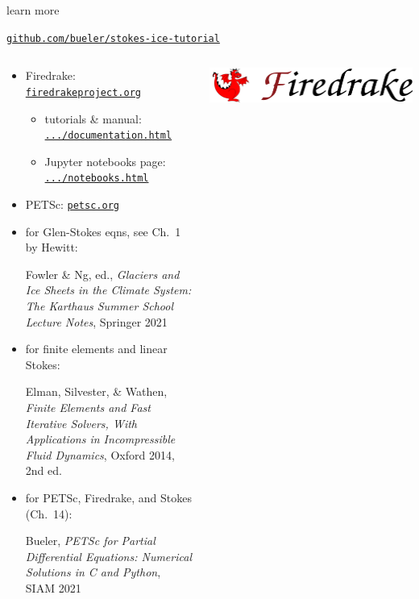 \documentclass[10pt,
               hyperref={colorlinks,citecolor=DeepPink4,linkcolor=black,urlcolor=blue},
               svgnames]{beamer}
\begin{document}
\begin{frame}{learn more}

\centerline{\large \href{https://github.com/bueler/stokes-ice-tutorial}{\texttt{github.com/bueler/stokes-ice-tutorial}}}

\medskip
\hrulefill


\begin{columns}
\begin{column}{0.6\textwidth}
\small

\begin{itemize}
\item Firedrake: \href{https://www.firedrakeproject.org/}{\texttt{firedrakeproject.org}}

    \begin{itemize}
    \scriptsize
    \item tutorials \& manual: \href{https://www.firedrakeproject.org/documentation.html}{\texttt{.../documentation.html}}
    \item Jupyter notebooks page: \href{https://www.firedrakeproject.org/notebooks.html}{\texttt{.../notebooks.html}}
    \end{itemize}
\item PETSc: \href{https://petsc.org}{\texttt{petsc.org}}
\item for Glen-Stokes eqns, see Ch.~1 by Hewitt:


{\scriptsize Fowler \& Ng, ed., \emph{Glaciers and Ice Sheets in the Climate System: The Karthaus Summer School Lecture Notes}, Springer 2021}

\item for finite elements and linear Stokes:

{\scriptsize Elman, Silvester, \& Wathen, \emph{Finite Elements and Fast Iterative Solvers, With Applications in Incompressible Fluid Dynamics}, Oxford 2014, 2nd ed.}

\item for PETSc, Firedrake, and Stokes (Ch.~14):

{\scriptsize Bueler, \emph{PETSc for Partial Differential Equations: Numerical Solutions in C and Python}, SIAM 2021}
\end{itemize}
\end{column}

\begin{column}{0.4\textwidth}

\bigskip
\href{https://www.firedrakeproject.org/}{\includegraphics[width=\textwidth]{figs/firedrakebanner.png}}


\end{column}
\end{columns}
\end{frame}
\end{document}
